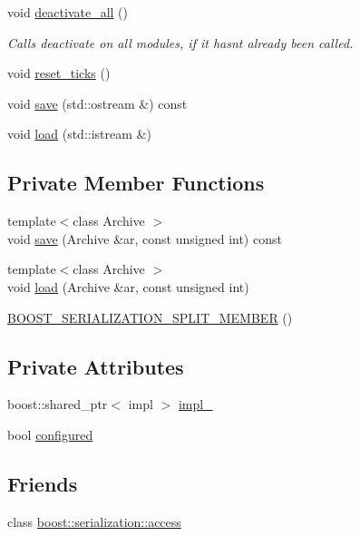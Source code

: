 \begin{DoxyCompactItemize}
void \hyperlink{structecto_1_1plasm_a6c10f2812f731c3787e5e22bdd80e9bc}{deactivate\+\_\+all} ()
\begin{DoxyCompactList}\small\item\em Calls deactivate on all modules, if it hasn\textquotesingle{}t already been called. \end{DoxyCompactList}\item 
void \hyperlink{structecto_1_1plasm_a992f656fa931efc20d2cf1a97c963cec}{reset\+\_\+ticks} ()
\item 
void \hyperlink{structecto_1_1plasm_ab0fd6bec2e5d8943363fe5aa36c1d676}{save} (std\+::ostream \&) const 
\item 
void \hyperlink{structecto_1_1plasm_a854400c2f46f995731e058c72a547185}{load} (std\+::istream \&)
\end{DoxyCompactItemize}
\subsection*{Private Member Functions}
\begin{DoxyCompactItemize}
\item 
{\footnotesize template$<$class Archive $>$ }\\void \hyperlink{structecto_1_1plasm_a420eb464746042e8247a69828e6782af}{save} (Archive \&ar, const unsigned int) const 
\item 
{\footnotesize template$<$class Archive $>$ }\\void \hyperlink{structecto_1_1plasm_ae6540bca37d0980ec24b0b75061e124e}{load} (Archive \&ar, const unsigned int)
\item 
\hyperlink{structecto_1_1plasm_ac443cf0a58324a8003e1c9fd3b49b428}{B\+O\+O\+S\+T\+\_\+\+S\+E\+R\+I\+A\+L\+I\+Z\+A\+T\+I\+O\+N\+\_\+\+S\+P\+L\+I\+T\+\_\+\+M\+E\+M\+B\+E\+R} ()
\end{DoxyCompactItemize}
\subsection*{Private Attributes}
\begin{DoxyCompactItemize}
\item 
boost\+::shared\+\_\+ptr$<$ impl $>$ \hyperlink{structecto_1_1plasm_a4cfd41e9dc82039a75970755565b2513}{impl\+\_\+}
\item 
bool \hyperlink{structecto_1_1plasm_a8d074da8290587fab0ed04d5cfe3f6b1}{configured}
\end{DoxyCompactItemize}
\subsection*{Friends}
\begin{DoxyCompactItemize}
\item 
class \hyperlink{structecto_1_1plasm_ac98d07dd8f7b70e16ccb9a01abf56b9c}{boost\+::serialization\+::access}
\end{DoxyCompactItemize}


